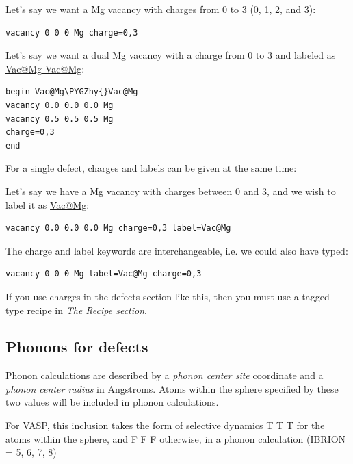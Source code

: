 \documentclass[letterpaper,10pt,english]{sphinxmanual}
\def\PYGZhy{\char`\-}
\begin{document}
Let's say we want a Mg vacancy with charges from 0 to 3 (0, 1, 2, and 3):

\begin{Verbatim}[commandchars=\\\{\}]
vacancy 0 0 0 Mg charge=0,3
\end{Verbatim}

Let's say we want a dual Mg vacancy with a charge from 0 to 3 and labeled as \href{mailto:Vac@Mg}{Vac@Mg}\href{mailto:-Vac@Mg}{-Vac@Mg}:

\begin{Verbatim}[commandchars=\\\{\}]
begin Vac@Mg\PYGZhy{}Vac@Mg
vacancy 0.0 0.0 0.0 Mg
vacancy 0.5 0.5 0.5 Mg
charge=0,3
end
\end{Verbatim}

For a single defect, charges and labels can be given at the same time:

Let's say we have a Mg vacancy with charges between 0 and 3, and we wish to label it as \href{mailto:Vac@Mg}{Vac@Mg}:

\begin{Verbatim}[commandchars=\\\{\}]
vacancy 0.0 0.0 0.0 Mg charge=0,3 label=Vac@Mg
\end{Verbatim}

The charge and label keywords are interchangeable, i.e. we could also have typed:

\begin{Verbatim}[commandchars=\\\{\}]
vacancy 0 0 0 Mg label=Vac@Mg charge=0,3
\end{Verbatim}

If you use charges in the defects section like this, then you must use a tagged  type recipe in {\hyperref[3_1_3_recipe::doc]{\emph{The Recipe section}}}.


\subsection{Phonons for defects}
\label{3_1_5_defects:phonons-for-defects}
Phonon calculations are described by a \emph{phonon center site} coordinate and a \emph{phonon center radius} in Angstroms. Atoms within the sphere specified by these two values will be included in phonon calculations.

For VASP, this inclusion takes the form of selective dynamics T T T for the atoms within the sphere, and F F F otherwise, in a phonon calculation (IBRION = 5, 6, 7, 8)
\end{document}
